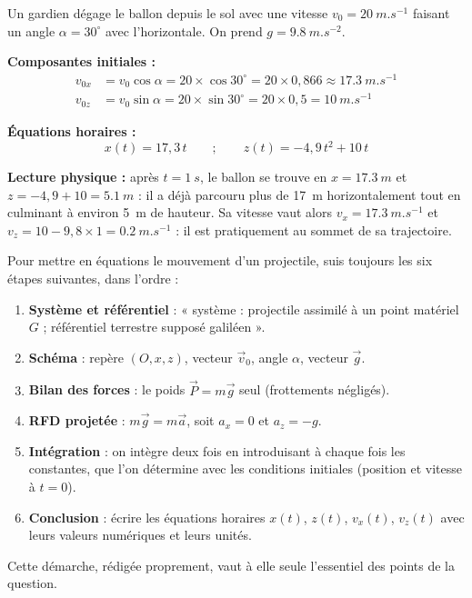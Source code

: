 \documentclass[11pt]{article}
\begin{document}
\begin{exemplebox}
Un gardien dégage le ballon depuis le sol avec une vitesse $v_0 = \SI{20}{m.s^{-1}}$ faisant un angle $\alpha = 30^{\circ}$ avec l'horizontale. On prend $g = \SI{9,8}{m.s^{-2}}$.

\textbf{Composantes initiales :}
\begin{align*}
v_{0x} &= v_0\cos\alpha = 20\times\cos 30^{\circ} = 20\times 0{,}866 \approx \SI{17,3}{m.s^{-1}} \\
v_{0z} &= v_0\sin\alpha = 20\times\sin 30^{\circ} = 20\times 0{,}5 = \SI{10}{m.s^{-1}}
\end{align*}

\textbf{Équations horaires :}
\[ x(t) = 17{,}3\,t \qquad ; \qquad z(t) = -4{,}9\,t^2 + 10\,t \]

\textbf{Lecture physique :} après $t = \SI{1}{s}$, le ballon se trouve en $x = \SI{17,3}{m}$ et $z = -4{,}9 + 10 = \SI{5,1}{m}$ : il a déjà parcouru plus de \SI{17}{m} horizontalement tout en culminant à environ \SI{5}{m} de hauteur. Sa vitesse vaut alors $v_x = \SI{17,3}{m.s^{-1}}$ et $v_z = 10 - 9{,}8\times 1 = \SI{0,2}{m.s^{-1}}$ : il est pratiquement au sommet de sa trajectoire.
\end{exemplebox}

\begin{methode}
Pour mettre en équations le mouvement d'un projectile, suis toujours les six étapes suivantes, dans l'ordre :
\begin{enumerate}
\item \textbf{Système et référentiel} : « système : projectile assimilé à un point matériel $G$ ; référentiel terrestre supposé galiléen ».
\item \textbf{Schéma} : repère $(O, x, z)$, vecteur $\vec{v}_0$, angle $\alpha$, vecteur $\vec{g}$.
\item \textbf{Bilan des forces} : le poids $\vec{P} = m\vec{g}$ seul (frottements négligés).
\item \textbf{RFD projetée} : $m\vec{g} = m\vec{a}$, soit $a_x = 0$ et $a_z = -g$.
\item \textbf{Intégration} : on intègre deux fois en introduisant à chaque fois les constantes, que l'on détermine avec les conditions initiales (position et vitesse à $t = 0$).
\item \textbf{Conclusion} : écrire les équations horaires $x(t)$, $z(t)$, $v_x(t)$, $v_z(t)$ avec leurs valeurs numériques et leurs unités.
\end{enumerate}
Cette démarche, rédigée proprement, vaut à elle seule l'essentiel des points de la question.
\end{methode}
\end{document}
